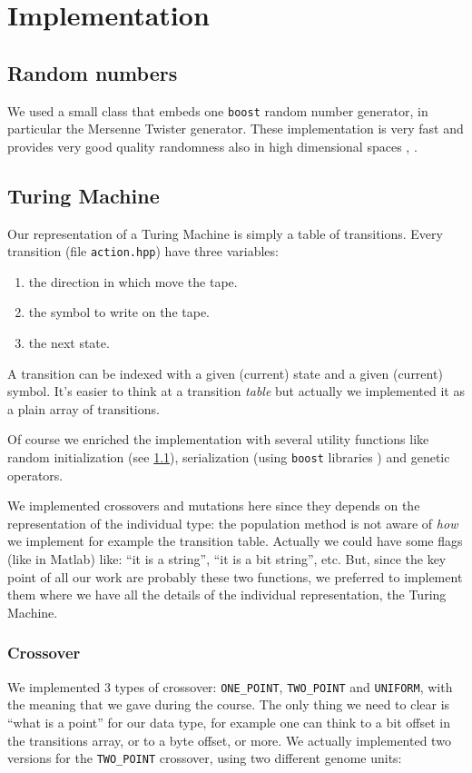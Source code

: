 \documentclass{report}
\begin{document}
\chapter{Implementation}
\label{chap:impl}

\section{Random numbers}
\label{sec:random}
We used a small class that embeds one \texttt{boost} random number generator, in particular the Mersenne Twister generator. These implementation is very fast and provides very good quality randomness also in high dimensional spaces \cite{boost-random}, \cite{mersenne-twister}.

\section{Turing Machine}
Our representation of a Turing Machine is simply a table of transitions. Every transition (file \texttt{action.hpp}) have three variables:
\begin{enumerate}
\item the direction in which move the tape.
\item the symbol to write on the tape.
\item the next state.
\end{enumerate}
A transition can be indexed with a given (current) state and a given (current) symbol. It's easier to think at a transition \textit{table} but actually we implemented it as a plain array of transitions.

Of course we enriched the implementation with several utility functions like random initialization (see \ref{sec:random}), serialization (using \texttt{boost} libraries \cite{boost-serialization}) and genetic operators.

We implemented crossovers and mutations here since they depends on the representation of the individual type: the population method is not aware of \textit{how} we implement for example the transition table. Actually we could have some flags (like in Matlab) like: ``it is a string'', ``it is a bit string'', etc. But, since the key point of all our work are probably these two functions, we preferred to implement them where we have all the details of the individual representation, the Turing Machine.

\subsection{Crossover}
\label{sec:crossover}
We implemented 3 types of crossover: \texttt{ONE\_POINT}, \texttt{TWO\_POINT} and \texttt{UNIFORM}, with the meaning that we gave during the course. The only thing we need to clear is ``what is a point'' for our data type, for example one can think to a bit offset in the transitions array, or to a byte offset, or more.
We actually implemented two versions for the \texttt{TWO\_POINT} crossover, using two different genome units:
\end{document}
